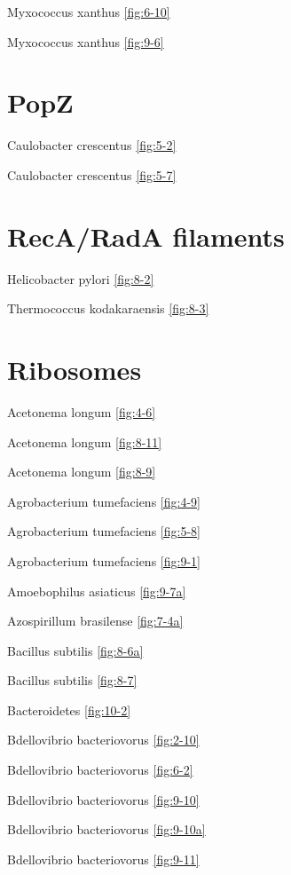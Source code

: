 \documentclass[]{tufte-book}
\begin{document}
Myxococcus xanthus \ref{fig:6-10}

Myxococcus xanthus \ref{fig:9-6}

\hypertarget{popz}{%
\section*{PopZ}\label{popz}}

Caulobacter crescentus \ref{fig:5-2}

Caulobacter crescentus \ref{fig:5-7}

\hypertarget{recarada-filaments}{%
\section*{RecA/RadA filaments}\label{recarada-filaments}}

Helicobacter pylori \ref{fig:8-2}

Thermococcus kodakaraensis \ref{fig:8-3}

\hypertarget{ribosomes}{%
\section*{Ribosomes}\label{ribosomes}}

Acetonema longum \ref{fig:4-6}

Acetonema longum \ref{fig:8-11}

Acetonema longum \ref{fig:8-9}

Agrobacterium tumefaciens \ref{fig:4-9}

Agrobacterium tumefaciens \ref{fig:5-8}

Agrobacterium tumefaciens \ref{fig:9-1}

Amoebophilus asiaticus \ref{fig:9-7a}

Azospirillum brasilense \ref{fig:7-4a}

Bacillus subtilis \ref{fig:8-6a}

Bacillus subtilis \ref{fig:8-7}

Bacteroidetes \ref{fig:10-2}

Bdellovibrio bacteriovorus \ref{fig:2-10}

Bdellovibrio bacteriovorus \ref{fig:6-2}

Bdellovibrio bacteriovorus \ref{fig:9-10}

Bdellovibrio bacteriovorus \ref{fig:9-10a}

Bdellovibrio bacteriovorus \ref{fig:9-11}
\end{document}
